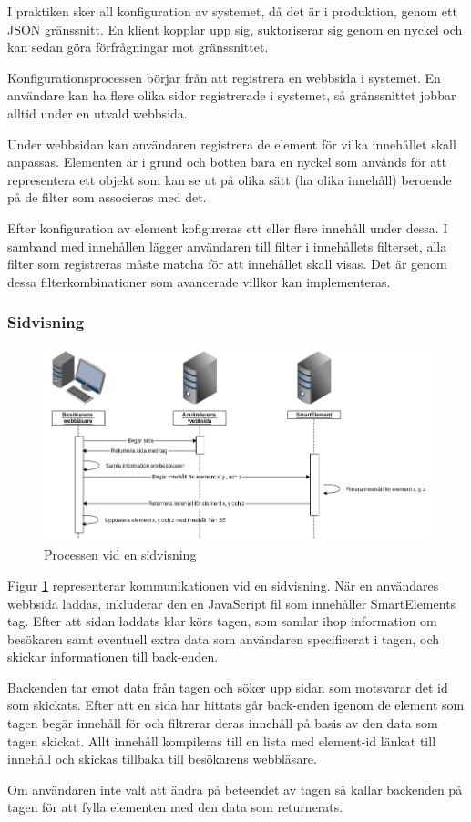 I praktiken sker all konfiguration av systemet, då det är i produktion, genom ett JSON gränssnitt. En klient kopplar upp sig, suktoriserar sig genom en nyckel och kan sedan göra förfrågningar mot gränssnittet.

Konfigurationsprocessen börjar från att registrera en webbsida i systemet. En användare kan ha flere olika sidor registrerade i systemet, så gränssnittet jobbar alltid under en utvald webbsida.

Under webbsidan kan användaren registrera de element för vilka innehållet skall anpassas. Elementen är i grund och botten bara en nyckel som används för att representera ett objekt som kan se ut på olika sätt (ha olika innehåll) beroende på de filter som associeras med det.

Efter konfiguration av element kofigureras ett eller flere innehåll under dessa. I samband med innehållen lägger användaren till filter i innehållets filterset, alla filter som registreras måste matcha för att innehållet skall visas. Det är genom dessa filterkombinationer som avancerade villkor kan implementeras.

\subsubsection{Sidvisning}

\begin{figure}[h!]
\centering
\includegraphics[width=150mm]{assets/images/smelementactivity.png}
\caption{Processen vid en sidvisning}
\label{pageviewprocess}
\end{figure}

Figur \ref{pageviewprocess} representerar kommunikationen vid en sidvisning. När en användares webbsida laddas, inkluderar den en JavaScript fil som innehåller SmartElements tag. Efter att sidan laddats klar körs tagen, som samlar ihop information om besökaren samt eventuell extra data som användaren specificerat i tagen, och skickar informationen till back-enden.

Backenden tar emot data från tagen och söker upp sidan som motsvarar det id som skickats. Efter att en sida har hittats går back-enden igenom de element som tagen begär innehåll för och filtrerar deras innehåll på basis av den data som tagen skickat. Allt innehåll kompileras till en lista med element-id länkat till innehåll och skickas tillbaka till besökarens webbläsare.

Om användaren inte valt att ändra på beteendet av tagen så kallar backenden på tagen för att fylla elementen med den data som returnerats.
